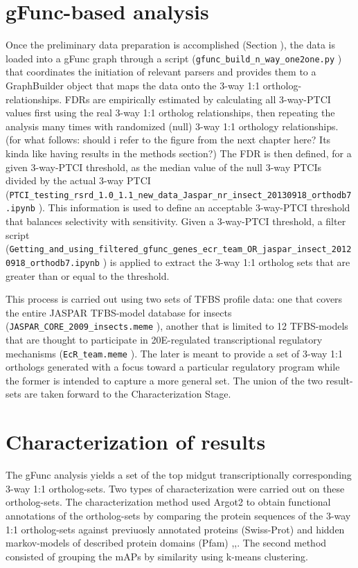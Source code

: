 \section{gFunc-based analysis}
Once the preliminary data preparation is accomplished (Section \label{sec:prelim-data}), the data is loaded into a \gls{gFunc} graph through a script (\texttt{gfunc\_build\_n\_way\_one2one.py} \cite{Dunn2013dissSupl}) that coordinates the initiation of relevant parsers and provides them to a GraphBuilder object that maps the data onto the 3-way 1:1 ortholog-relationships.
\glspl{FDR} are empirically estimated by calculating all 3-way-\gls{PTCI} values first using the real 3-way 1:1 ortholog relationships, then repeating the analysis many times with randomized (null) 3-way 1:1 orthology relationships.
\alert{(for what follows: should i refer to the figure from the next chapter here?  Its kinda like having results in the methods section?)}
The \gls{FDR} is then defined, for a given 3-way-\gls{PTCI} threshold, as the median value of the null 3-way \glspl{PTCI} divided by the actual 3-way \gls{PTCI} (\texttt{PTCI\_testing\_rsrd\_1.0\_1.1\_new\_data\_Jaspar\_nr\_insect\_20130918\_orthodb7.ipynb} \cite{Dunn2013dissSupl}).
This information is used to define an acceptable 3-way-\gls{PTCI} threshold that balances selectivity with sensitivity.
Given a 3-way-\gls{PTCI} threshold, a filter script (\texttt{Getting\_and\_using\_filtered\_gfunc\_genes\_ecr\_team\_OR\_jaspar\_insect\_20120918\_orthodb7.ipynb} \cite{Dunn2013dissSupl}) is applied to extract the 3-way 1:1 ortholog sets that are greater than or equal to the threshold.

This process is carried out using two sets of \gls{TFBS} profile data: one that covers the entire JASPAR \gls{TFBS}-model database for insects (\texttt{JASPAR\_CORE\_2009\_insects.meme}  \cite{Dunn2013dissSupl}), another that is limited to 12 \gls{TFBS}-models that are thought to participate in \gls{20E}-regulated transcriptional regulatory mechanisms (\texttt{EcR\_team.meme} \cite{Dunn2013dissSupl}).
The later is meant to provide a set of 3-way 1:1 orthologs generated with a focus toward a particular regulatory program while the former is intended to capture a more general set.
The union of the two result-sets are taken forward to the Characterization Stage.



\section{Characterization of results} \label{chap:3-sec:characterization-of-results}
The \gls{gFunc} analysis yields a set of the top midgut transcriptionally corresponding 3-way 1:1 ortholog-sets.
Two types of characterization were carried out on these ortholog-sets.
The characterization method used \gls{Argot2} to obtain functional annotations of the ortholog-sets by comparing the protein sequences of the 3-way 1:1 ortholog-sets against previuosly annotated proteins (\gls{Swiss-Prot}) and hidden markov-models of described protein domains (\gls{Pfam}) \cite{Boeckmann},\cite{Punta2012},\cite{Falda2012}.
The second method consisted of grouping the \glspl{mAP} by similarity using k-means clustering.

